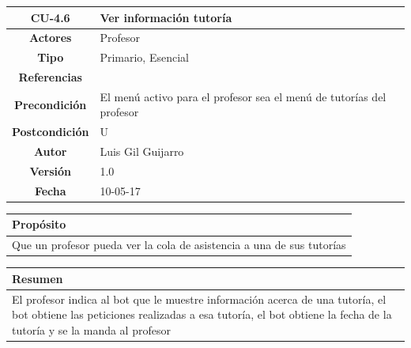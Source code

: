 \begin{table}[!ht]

\begin{tabular}{|c|m{10cm}|}
\hline\rowcolor{Gray}
{\bf CU-4.6 } & { Ver información tutoría}\\
\hline
{\bf Actores } & { Profesor} \\
\hline\rowcolor{Gray}
{\bf Tipo } & { Primario, Esencial} \\
\hline
{\bf Referencias }& {} \\
\hline\rowcolor{Gray}
{\bf Precondición }& {El menú activo para el profesor sea el menú de tutorías del profesor} \\
\hline
{\bf Postcondición }& {U}\\
\hline\rowcolor{Gray}
{\bf Autor }& { Luis Gil Guijarro}  \\
\hline
{\bf Versión }& { 1.0} \\
\hline\rowcolor{Gray}
{\bf Fecha }& { 10-05-17} \\
\hline
\end{tabular}

\end{table}

\begin{table}[!ht]

\begin{tabular}{|m{10cm}|}
\hline\rowcolor{Gray}
{\bf Propósito}\\
\hline
{Que un profesor pueda ver la cola de asistencia a una de sus tutorías} \\
\hline

\end{tabular}


\end{table}

\begin{table}[!ht]

\begin{tabular}{|m{10cm}|}
\hline\rowcolor{Gray}
{\bf Resumen}\\
\hline
{El profesor indica al bot que le muestre información acerca de una tutoría, el bot obtiene las peticiones realizadas a esa tutoría, el bot obtiene la fecha de la tutoría y se la manda al profesor} \\
\hline

\end{tabular}



\end{table}


